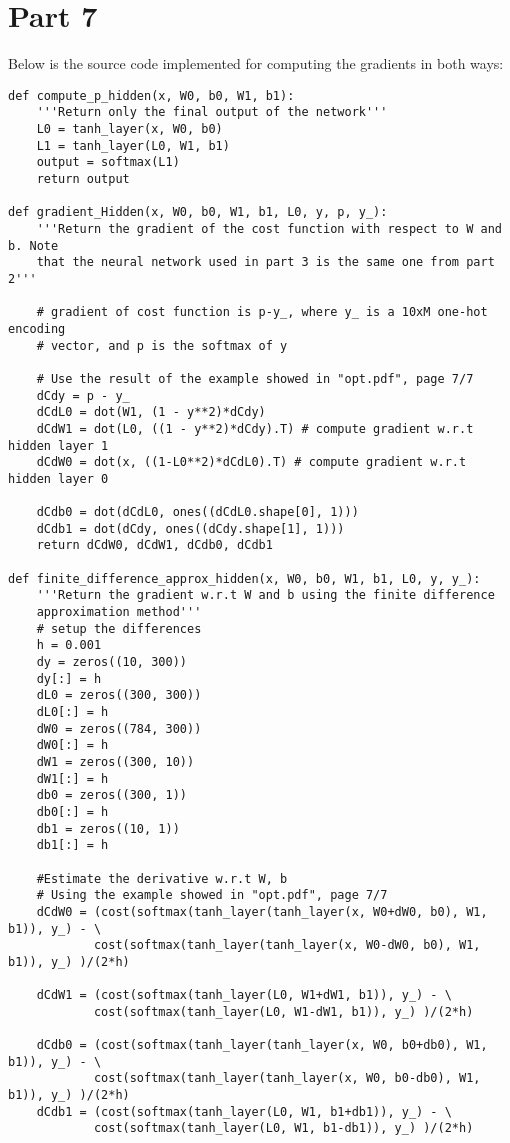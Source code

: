\documentclass{article}
\begin{document}
\section*{Part 7}
Below is the source code implemented for computing the gradients in both ways:\\
\begin{lstlisting}
def compute_p_hidden(x, W0, b0, W1, b1):
    '''Return only the final output of the network'''
    L0 = tanh_layer(x, W0, b0)
    L1 = tanh_layer(L0, W1, b1)
    output = softmax(L1)
    return output

def gradient_Hidden(x, W0, b0, W1, b1, L0, y, p, y_):
    '''Return the gradient of the cost function with respect to W and b. Note
    that the neural network used in part 3 is the same one from part 2'''

    # gradient of cost function is p-y_, where y_ is a 10xM one-hot encoding
    # vector, and p is the softmax of y

    # Use the result of the example showed in "opt.pdf", page 7/7
    dCdy = p - y_
    dCdL0 = dot(W1, (1 - y**2)*dCdy)
    dCdW1 = dot(L0, ((1 - y**2)*dCdy).T) # compute gradient w.r.t hidden layer 1
    dCdW0 = dot(x, ((1-L0**2)*dCdL0).T) # compute gradient w.r.t hidden layer 0
    
    dCdb0 = dot(dCdL0, ones((dCdL0.shape[0], 1)))
    dCdb1 = dot(dCdy, ones((dCdy.shape[1], 1)))
    return dCdW0, dCdW1, dCdb0, dCdb1

def finite_difference_approx_hidden(x, W0, b0, W1, b1, L0, y, y_):
    '''Return the gradient w.r.t W and b using the finite difference
    approximation method'''
    # setup the differences
    h = 0.001
    dy = zeros((10, 300))
    dy[:] = h
    dL0 = zeros((300, 300))
    dL0[:] = h
    dW0 = zeros((784, 300))
    dW0[:] = h
    dW1 = zeros((300, 10))
    dW1[:] = h
    db0 = zeros((300, 1))
    db0[:] = h
    db1 = zeros((10, 1))
    db1[:] = h

    #Estimate the derivative w.r.t W, b
    # Using the example showed in "opt.pdf", page 7/7
    dCdW0 = (cost(softmax(tanh_layer(tanh_layer(x, W0+dW0, b0), W1, b1)), y_) - \
            cost(softmax(tanh_layer(tanh_layer(x, W0-dW0, b0), W1, b1)), y_) )/(2*h)

    dCdW1 = (cost(softmax(tanh_layer(L0, W1+dW1, b1)), y_) - \
            cost(softmax(tanh_layer(L0, W1-dW1, b1)), y_) )/(2*h) 
    
    dCdb0 = (cost(softmax(tanh_layer(tanh_layer(x, W0, b0+db0), W1, b1)), y_) - \
            cost(softmax(tanh_layer(tanh_layer(x, W0, b0-db0), W1, b1)), y_) )/(2*h)
    dCdb1 = (cost(softmax(tanh_layer(L0, W1, b1+db1)), y_) - \
            cost(softmax(tanh_layer(L0, W1, b1-db1)), y_) )/(2*h)


\end{lstlisting}
\end{document}
